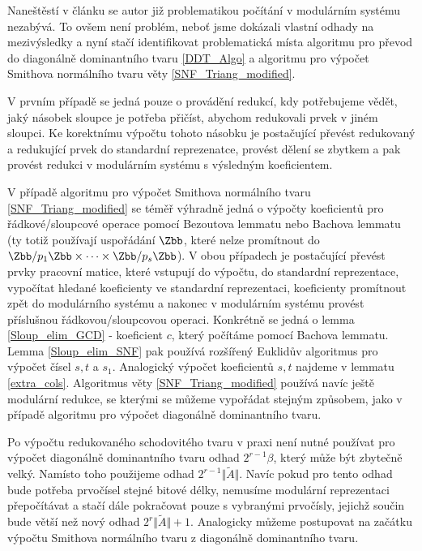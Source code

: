Naneštěstí v článku \cite{SNF_Arne} se autor již problematikou počítání v
modulárním systému nezabývá. To ovšem není problém, neboť jsme dokázali vlastní
odhady na mezivýsledky a nyní stačí identifikovat problematická místa algoritmu
pro převod do diagonálně dominantního tvaru \ref{DDT_Algo} a algoritmu pro 
výpočet Smithova normálního tvaru věty \ref{SNF_Triang_modified}.

V prvním případě se jedná pouze o provádění redukcí, kdy potřebujeme vědět, jaký
násobek sloupce je potřeba přičíst, abychom redukovali prvek v jiném sloupci. 
Ke korektnímu výpočtu tohoto násobku je postačující převést redukovaný a 
redukující prvek do standardní reprezenatce, provést dělení se zbytkem a pak 
provést redukci v modulárním systému s výsledným koeficientem.

V případě algoritmu pro výpočet Smithova normálního tvaru \ref{SNF_Triang_modified}
se téměř výhradně jedná o výpočty koeficientů pro řádkové/sloupcové operace
pomocí Bezoutova lemmatu nebo Bachova lemmatu (ty totiž používají
uspořádání $\Zbb$, které nelze promítnout do $\Zbb / p_1 \Zbb \times
\cdots \times \Zbb / p_s \Zbb$). V obou případech je postačující převést
prvky pracovní matice, které vstupují do výpočtu, do standardní reprezentace,
vypočítat hledané koeficienty ve standardní reprezentaci, koeficienty promítnout
zpět do modulárního systému a nakonec v modulárním systému provést příslušnou 
řádkovou/sloupcovou operaci. 
Konkrétně se jedná o lemma \ref{Sloup_elim_GCD} - koeficient $ c $, 
který počítáme pomocí Bachova lemmatu. Lemma \ref{Sloup_elim_SNF} pak používá 
rozšířený  Euklidův algoritmus pro výpočet čísel $ s, t $ a $ s_1 $. 
Analogický výpočet koeficientů $ s, t $ najdeme v lemmatu \ref{extra_cols}. 
Algoritmus věty \ref{SNF_Triang_modified} používá navíc ještě modulární
redukce, se kterými se můžeme vypořádat stejným způsobem, jako v případě 
algoritmu pro výpočet diagonálně dominantního tvaru. 

\begin{pozn}
Po výpočtu redukovaného schodovitého tvaru v praxi není nutné používat pro 
výpočet diagonálně dominantního tvaru odhad $ 2^{r - 1} \beta $, který může být 
zbytečně velký. Namísto toho použijeme odhad $ 2^{r - 1} \Vert \tilde{A} \Vert $.
Navíc pokud pro tento odhad bude potřeba prvočísel stejné bitové délky, nemusíme 
modulární reprezentaci přepočítávat a stačí dále pokračovat pouze s vybranými
prvočísly, jejichž součin bude větší než nový odhad 
$ 2^{r} \Vert \tilde{A} \Vert + 1 $. Analogicky můžeme postupovat na začátku
výpočtu Smithova normálního tvaru z diagonálně dominantního tvaru.
\end{pozn}

